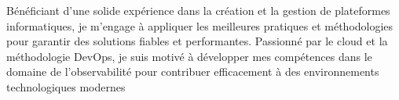 

\begin{cvparagraph}

Bénéficiant d'une solide expérience dans la création et la gestion de plateformes informatiques, je m'engage à appliquer les meilleures pratiques et méthodologies pour garantir des solutions fiables et performantes. Passionné par le cloud et la méthodologie DevOps, je suis motivé à développer mes compétences dans le domaine de l'observabilité pour contribuer efficacement à des environnements technologiques modernes
\end{cvparagraph}
